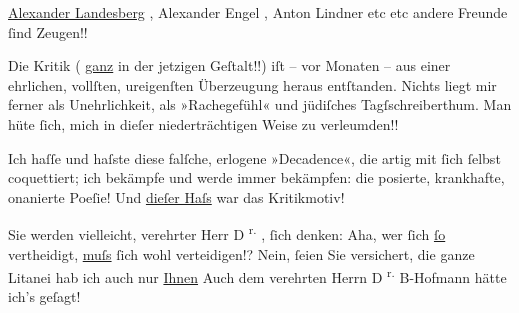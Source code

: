 \pstart
           \uline{Alexander Landesberg}
               , 
               Alexander Engel
               , 
               Anton Lindner
                etc etc andere Freunde ſind Zeugen!!
            \pend
           
\pstart
           
               Die 
               Kritik
                (
               \uline{ganz}
                in der jetzigen Geſtalt!!) iſt – vor Monaten –
               aus einer ehrlichen, vollſten, ureigenſten Überzeugung heraus entſtanden. Nichts
               liegt mir ferner als Unehrlichkeit, als »Rachegefühl« und jüdiſches
               Tagſschreiberthum. Man hüte ſich, mich in dieſer niederträchtigen Weise zu
               verleumden!!
            \pend
           
\pstart
           
               Ich haſſe und haſste diese falſche, erlogene »Decadence«, die artig mit ſich ſelbst
               coquettiert; ich bekämpfe und werde immer bekämpfen: die posierte, krankhafte,
               onanierte Poeſie! 
               {\pb}
               Und 
               \uline{dieſer Haſs}
                war das Kritikmotiv!
            \pend
           
\pstart
                Sie werden vielleicht, verehrter Herr D
               \textsuperscript{r.}
               , ſich denken: Aha, wer ſich 
               \uline{ſo}
                vertheidigt, 
               \uline{muſs}{ }
               ſich wohl verteidigen!? 
                Nein, ſeien Sie versichert, die ganze Litanei hab ich auch nur 
               \uline{Ihnen}\noindent{}
                     Auch dem verehrten Herrn D
                     \textsuperscript{r.}{ }B-Hofmann
                      hätte ich’s geſagt!
                  
